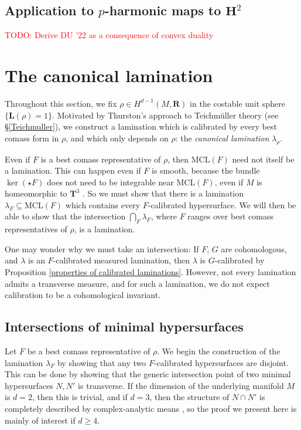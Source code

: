 \documentclass[reqno,11pt]{amsart}
\newcommand{\RR}{\mathbf{R}}
\newcommand{\Hyp}{\mathbf H}
\newcommand{\MCL}{\mathrm{MCL}}
\newcommand{\Comass}{\mathbf L}
\newcommand{\dfn}[1]{\emph{#1}\index{#1}}
\theoremstyle{definition}
\numberwithin{equation}{section}
\newcommand\todo[1]{\textcolor{red}{TODO: #1}}
\begin{document}
\subsection{Application to \texorpdfstring{$p$-harmonic}{p-harmonic} maps to \texorpdfstring{$\Hyp^2$}{hyperbolic space}}
\todo{Derive DU '22 as a consequence of convex duality}

\section{The canonical lamination}
\label{canonical sec}
Throughout this section, we fix $\rho \in H^{d - 1}(M, \RR)$ in the costable unit sphere $\{\Comass(\rho) = 1\}$.
Motivated by Thurston's approach to Teichm\"uller theory (see \S\ref{Teichmuller}), we construct a lamination which is calibrated by every best comass form in $\rho$, and which only depends on $\rho$: the \dfn{canonical lamination} $\lambda_\rho$.

Even if $F$ is a best comass representative of $\rho$, then $\MCL(F)$ need not itself be a lamination.
This can happen even if $F$ is smooth, because the bundle $\ker(\star F)$ does not need to be integrable near $\MCL(F)$, even if $M$ is homeomorphic to $\mathbf T^3$ \cite[Example 5.4]{bangert_cui_2017}.
So we must show that there is a lamination $\lambda_F \subseteq \MCL(F)$ which contains every $F$-calibrated hypersurface.
We will then be able to show that the intersection $\bigcap_F \lambda_F$, where $F$ ranges over best comass representatives of $\rho$, is a lamination.

One may wonder why we must take an intersection:
If $F$, $G$ are cohomologous, and $\lambda$ is an $F$-calibrated measured lamination, then $\lambda$ is $G$-calibrated by Proposition \ref{properties of calibrated laminations}.
However, not every lamination admits a transverse measure, and for such a lamination, we do not expect calibration to be a cohomological invariant.


\subsection{Intersections of minimal hypersurfaces}\label{nodal appendix}
Let $F$ be a best comass representative of $\rho$.
We begin the construction of the lamination $\lambda_F$ by showing that any two $F$-calibrated hypersurfaces are disjoint.
This can be done by showing that the generic intersection point of two minimal hypersurfaces $N, N'$ is transverse.
If the dimension of the underlying manifold $M$ is $d = 2$, then this is trivial, and if $d = 3$, then the structure of $N \cap N'$ is completely described by complex-analytic means \cite[Theorem 7.3]{colding2011course}, so the proof we present here is mainly of interest if $d \geq 4$.
\end{document}
